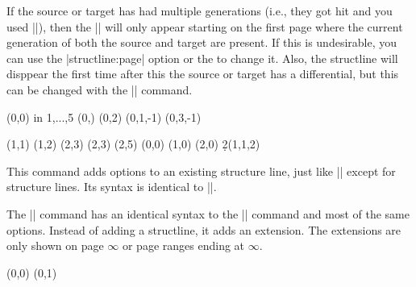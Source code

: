 \begin{sseqdata}[name = basic, cohomological Serre grading]
\begin{command}{\structline\ooptions\opt{\pars{\sourcecoord}\pars{\targetcoord}}}
If the source or target has had multiple generations (i.e., they got hit and you
used |\replaceclass|), then the |\structline| will only appear starting on the
first page where the current generation of both the source and target are
present. If this is undesirable, you can use the |structline:page| option or the
to change it. Also, the structline will disppear the first time after this the
source or target has a differential, but this can be changed with the
|\replacestructlines| command.
\begin{codeexample}[width = 7.5cm]
\DeclareSseqGroup\tower {} {
    \class(0,0)
    \foreach \y in {1,...,5} {
        \class(0,\y)
        \structline
    }
    \class(0,2)
    \structline(0,1,-1)
    \structline(0,3,-1)
}
\begin{sseqdata}[ name = structline example,
                  classes = { circle, fill },
                  Adams grading, no axes,
                  yscale = 1.28 ]
\class(1,1) \class(1,2)
\class(2,3) \class(2,3) \class(2,5)
\tower[classes = blue](0,0)
\tower[struct lines = dashed,orange](1,0)
\tower[struct lines = red](2,0)
\d2(1,1,2)
\end{sseqdata}
\printpage[ name = structline example, page = 2 ] \quad
\printpage[ name = structline example, page = 3 ]
\end{codeexample}
\end{command}

\begin{command}{\structlineoptions\moptions\opt{\pars{\sourcecoord}\pars{\targetcoord}}}
This command adds options to an existing structure line, just like
|\classoptions| except for structure lines. Its syntax is identical to
|\structline|.
\end{command}

\begin{command}{\extension\ooptions\opt{\pars{\sourcecoord}\pars{\targetcoord}}}
The |\extension| command has an identical syntax to the |\structline| command
and most of the same options. Instead of adding a structline, it adds an
extension. The extensions are only shown on page $\infty$ or page ranges ending
at $\infty$.

\begin{codeexample}[width = 7.5cm]
\begin{sseqdata}[ name = extension example,
                  classes = { circle, fill },
                  Adams grading, no axes,
                  yscale = 1.28 ]
\class(0,0) \class(0,1)
\extension
\end{sseqdata}
\printpage[ name = extension example, page = 2 ] \quad
\printpage[ name = extension example, page = \infty ]
\end{codeexample}    
\end{command}


\end{sseqdata}
